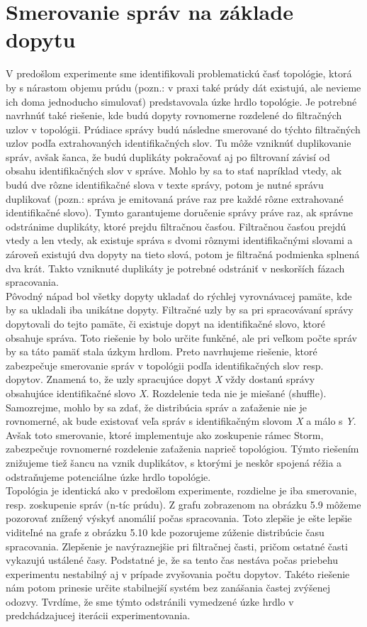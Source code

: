 \section{Smerovanie správ na základe dopytu}
V predošlom experimente sme identifikovali problematickú časť topológie, ktorá by s nárastom objemu prúdu (pozn.: v praxi také prúdy dát existujú, ale nevieme ich doma jednoducho simulovať) predstavovala úzke hrdlo topológie. Je potrebné navrhnúť také riešenie, kde budú dopyty rovnomerne rozdelené do filtračných uzlov v topológii. Prúdiace správy budú následne smerované do týchto filtračných uzlov podľa extrahovaných identifikačných slov. Tu môže vzniknúť duplikovanie správ, avšak šanca, že budú duplikáty pokračovať aj po filtrovaní závisí od obsahu identifikačných slov v správe. Mohlo by sa to stať napríklad vtedy, ak budú dve rôzne identifikačné slova v texte správy, potom je nutné správu duplikovať (pozn.: správa je emitovaná práve raz pre každé rôzne extrahované identifikačné slovo). Tymto garantujeme doručenie správy práve raz, ak správne odstránime duplikáty, ktoré prejdu filtračnou časťou. Filtračnou časťou prejdú vtedy a len vtedy, ak existuje správa s dvomi rôznymi identifikačnými slovami a zároveň existujú dva dopyty na tieto slová, potom je filtračná podmienka splnená dva krát. Takto vzniknuté duplikáty je potrebné odstrániť v neskorších fázach spracovania. 
\\[5pt]
Pôvodný nápad bol všetky dopyty ukladať do rýchlej vyrovnávacej pamäte, kde by sa ukladali iba unikátne dopyty. Filtračné uzly by sa pri spracovávaní správy dopytovali do tejto pamäte, či existuje dopyt na identifikačné slovo, ktoré obsahuje správa. Toto riešenie by bolo určite funkčné, ale pri veľkom počte správ by sa táto pamäť stala úzkym hrdlom. Preto navrhujeme riešenie, ktoré zabezpečuje smerovanie správ v topológii podľa identifikačných slov resp. dopytov. Znamená to, že uzly spracujúce dopyt \textit{X} vždy dostanú správy obsahujúce identifikačné slovo \textit{X}. Rozdelenie teda nie je miešané (shuffle). Samozrejme, mohlo by sa zdať, že distribúcia správ a zaťaženie nie je rovnomerné, ak bude existovať veľa správ s identifikačným slovom \textit{X} a málo s \textit{Y}. Avšak toto smerovanie, ktoré implementuje ako zoskupenie rámec Storm, zabezpečuje rovnomerné rozdelenie zaťaženia naprieč topológiou. Týmto riešením znižujeme tiež šancu na vznik duplikátov, s ktorými je neskôr spojená réžia a odstraňujeme potenciálne úzke hrdlo topológie. 
\\[5pt]
Topológia je identická ako v predošlom experimente, rozdielne je iba smerovanie, resp. zoskupenie správ (n-tíc prúdu). Z grafu zobrazenom na obrázku 5.9 môžeme pozorovať znížený výskyť anomálií počas spracovania. Toto zlepšie je ešte lepšie viditeľné na grafe z obrázku 5.10 kde pozorujeme zúženie distribúcie času spracovania. Zlepšenie je navýraznejšie pri filtračnej časti, pričom ostatné časti vykazujú ustálené časy. Podstatné je, že sa tento čas nestáva počas priebehu experimentu nestabilný aj v prípade zvyšovania počtu dopytov. Takéto riešenie nám potom prinesie určite stabilnejší systém bez zanášania častej zvýšenej odozvy. Tvrdíme, že sme týmto odstránili vymedzené úzke hrdlo v predchádzajucej iterácii experimentovania. 
